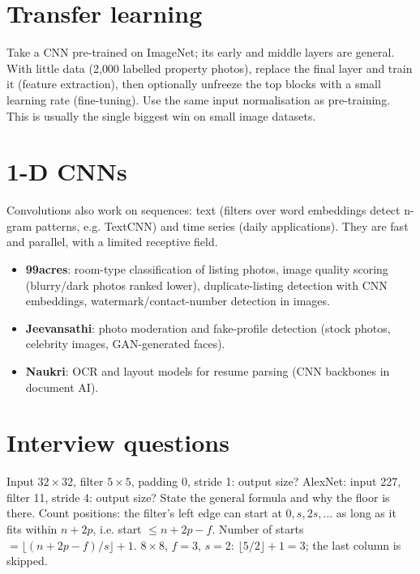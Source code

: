 \section{Transfer learning}
Take a CNN pre-trained on ImageNet; its early and middle layers are general. With little data (2{,}000 labelled property photos), replace the final layer and
train it (feature extraction), then optionally unfreeze the top blocks with a small learning rate (fine-tuning). Use the same input normalisation as
pre-training. This is usually the single biggest win on small image datasets.

\section{1-D CNNs}
Convolutions also work on sequences: text (filters over word embeddings detect n-gram patterns, e.g. TextCNN) and time series (daily applications). They are
fast and parallel, with a limited receptive field.

\begin{practical}
\begin{itemize}
\item \textbf{99acres}: room-type classification of listing photos, image quality scoring (blurry/dark photos ranked lower), duplicate-listing detection with
  CNN embeddings, watermark/contact-number detection in images.
\item \textbf{Jeevansathi}: photo moderation and fake-profile detection (stock photos, celebrity images, GAN-generated faces).
\item \textbf{Naukri}: OCR and layout models for resume parsing (CNN backbones in document AI).
\end{itemize}
\end{practical}

\section{Interview questions}

\begin{qa}{ Input $32\times32$, filter $5\times5$, padding 0, stride 1: output size? AlexNet: input 227, filter 11, stride 4: output size?
State the general formula and why the floor is there.}
\why Count positions: the filter's left edge can start at $0, s, 2s, \dots$ as long as it fits within $n + 2p$, i.e. start $\le n + 2p - f$. Number of
starts $= \lfloor(n + 2p - f)/s\rfloor + 1$.
\worked $8\times8$, $f = 3$, $s = 2$: $\lfloor5/2\rfloor + 1 = 3$; the last column is skipped.
\end{qa}

